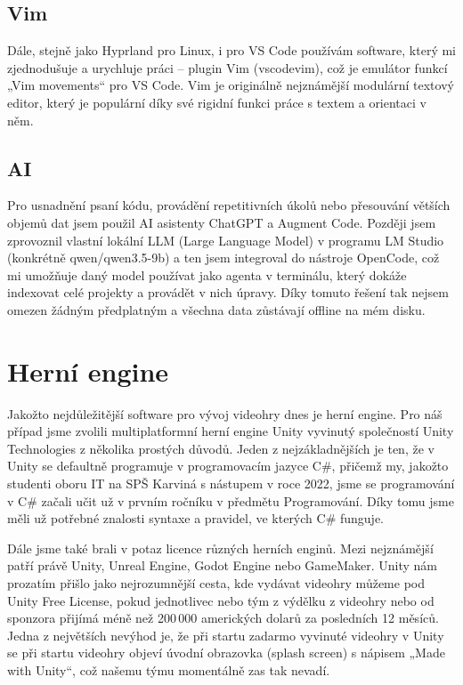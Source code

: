 \subsection{Vim}
Dále, stejně jako Hyprland pro Linux, i pro VS Code používám software, který mi zjednodušuje a urychluje práci – plugin Vim (vscodevim), což je emulátor funkcí „Vim movements“ pro VS Code. Vim je originálně nejznámější modulární textový editor, který je populární díky své rigidní funkci práce s textem a orientaci v něm.

\subsection{AI}
Pro usnadnění psaní kódu, provádění repetitivních úkolů nebo přesouvání větších objemů dat jsem použil AI asistenty ChatGPT a Augment Code. Později jsem zprovoznil vlastní lokální LLM (Large Language Model) v programu LM Studio (konkrétně qwen/qwen3.5-9b) a ten jsem integroval do nástroje OpenCode, což mi umožňuje daný model používat jako agenta v terminálu, který dokáže indexovat celé projekty a provádět v nich úpravy. Díky tomuto řešení tak nejsem omezen žádným předplatným a všechna data zůstávají offline na mém disku.

\section{Herní engine}
Jakožto nejdůležitější software pro vývoj videohry dnes je herní engine. Pro náš případ jsme zvolili multiplatformní herní engine Unity vyvinutý společností Unity Technologies z několika prostých důvodů. Jeden z nejzákladnějších je ten, že v Unity se defaultně programuje v programovacím jazyce C\#, přičemž my, jakožto studenti oboru IT na SPŠ Karviná s nástupem v roce 2022, jsme se programování v C\# začali učit už v prvním ročníku v předmětu Programování. Díky tomu jsme měli už potřebné znalosti syntaxe a pravidel, ve kterých C\# funguje.

Dále jsme také brali v potaz licence různých herních enginů. Mezi nejznámější patří právě Unity, Unreal Engine, Godot Engine nebo GameMaker. Unity nám prozatím přišlo jako nejrozumnější cesta, kde vydávat videohry můžeme pod Unity Free License, pokud jednotlivec nebo tým z výdělku z videohry nebo od sponzora přijímá méně než 200 000 amerických dolarů za posledních 12 měsíců. Jedna z největších nevýhod je, že při startu zadarmo vyvinuté videohry v Unity se při startu videohry objeví úvodní obrazovka (splash screen) s nápisem „Made with Unity“, což našemu týmu momentálně zas tak nevadí.

